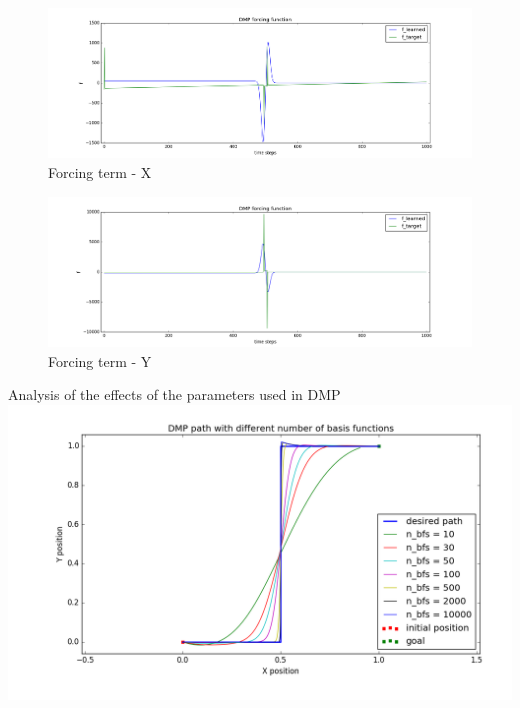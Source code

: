 \documentclass{beamer}
\begin{document}
	\begin{frame}
		\begin{figure}
			\includegraphics[scale=0.23]{images/f_x}
			\caption{Forcing term - X}
		\end{figure}

		\begin{figure}
			\includegraphics[scale=0.23]{images/f_y}
			\caption{Forcing term - Y}
		\end{figure}

	\end{frame}
	
	\begin{frame}{Analysis of the effects of the parameters used in DMP}
		\includegraphics[width=\textwidth]{images/n_bfs_}
	\end{frame}
	
\end{document}
